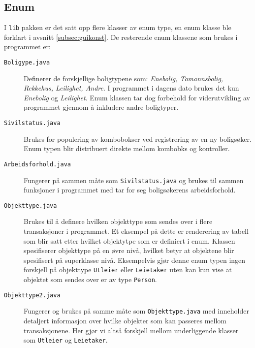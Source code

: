 \subsection{Enum}
I \texttt{lib} pakken er det satt opp flere klasser av enum type, en enum klasse ble forklart i avsnitt \ref{subsec:guikonst}. De resterende enum klassene som brukes i programmet er:
\begin{description}
\item[\texttt{Boligype.java}]
Definerer de forskjellige boligtypene som: \textit{Enebolig, Tomannsbolig, Rekkehus, Leilighet, Andre}. I programmet i dagens dato brukes det kun \textit{Enebolig} og \textit{Leilighet}. Enum klassen tar dog forbehold for viderutvikling av programmet gjennom å inkludere andre boligtyper.
\item[\texttt{Sivilstatus.java}]
Brukes for populering av kombobokser ved registrering av en ny boligsøker. Enum typen blir distribuert direkte mellom kombobks og kontroller.
\item[\texttt{Arbeidsforhold.java}]
Fungerer på sammen måte som \texttt{Sivilstatus.java} og brukes til sammen funksjoner i programmet med tar for seg boligsøkerens arbeidsforhold.
\item[\texttt{Objekttype.java}]
Brukes til å definere hvilken objekttype som sendes over i flere transaksjoner i programmet. Et eksempel på dette er renderering av tabell som blir satt etter hvilket objektytpe som er definiert i enum. 
Klassen spesifiserer objekttype på en øvre nivå, hvilket betyr at objektene blir spesifisert på superklasse nivå. Eksempelvis gjør denne enum typen ingen forskjell på objekttype \texttt{Utleier} eller \texttt{Leietaker} uten kan kun vise at objektet som sendes over er av type \texttt{Person}.
\item[\texttt{Objekttype2.java}]
Fungerer og brukes på samme måte som \texttt{Objekttype.java} med inneholder detaljert informasjon over hvilke objekter som kan passeres mellom transaksjonene. Her gjør vi altså forskjell mellom underliggende klasser som \texttt{Utleier} og \texttt{Leietaker}.

\end{description}